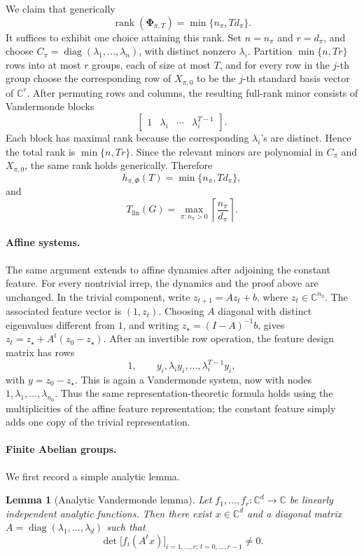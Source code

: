 \documentclass[11pt]{article}
\theoremstyle{plain}
\newtheorem{lemma}[theorem]{Lemma}
\theoremstyle{definition}
\theoremstyle{remark}
\begin{document}
We claim that generically
\[
\operatorname{rank}(\mathbf{\Phi}_{\pi,T})
=
\min\{n_\pi,Td_\pi\}.
\]
It suffices to exhibit one choice attaining this rank. Set
\(n=n_\pi\) and \(r=d_\pi\), and choose
\(C_\pi=\operatorname{diag}(\lambda_1,\ldots,\lambda_n)\), with distinct
nonzero \(\lambda_i\). Partition
\(\min\{n,Tr\}\) rows into at most \(r\) groups, each of size at most \(T\),
and for every row in the \(j\)-th group choose the corresponding row of
\(X_{\pi,0}\) to be the \(j\)-th standard basis vector of \(\mathbb C^r\).
After permuting rows and columns, the resulting full-rank minor consists of
Vandermonde blocks
\[
\begin{bmatrix}
1 & \lambda_i & \cdots & \lambda_i^{T-1}
\end{bmatrix}.
\]
Each block has maximal rank because the corresponding \(\lambda_i\)'s are
distinct. Hence the total rank is \(\min\{n,Tr\}\). Since the relevant minors
are polynomial in \(C_\pi\) and \(X_{\pi,0}\), the same rank holds
generically. Therefore
\[
h_{\pi,\Phi}(T)=\min\{n_\pi,Td_\pi\},
\]
and
\[
T_{\mathrm{lin}}(G)
=
\max_{\pi:n_\pi>0}
\left\lceil\frac{n_\pi}{d_\pi}\right\rceil .
\]

\paragraph{Affine systems.}
The same argument extends to affine dynamics after adjoining the constant
feature. For every nontrivial irrep, the dynamics and the proof above are
unchanged. In the trivial component, write
\(z_{t+1}=Az_t+b\), where \(z_t\in\mathbb C^{n_0}\). The associated feature
vector is \((1,z_t)\). Choosing \(A\) diagonal with distinct eigenvalues
different from \(1\), and writing \(z_\star=(I-A)^{-1}b\), gives
\(z_t=z_\star+A^t(z_0-z_\star)\). After an invertible row operation, the
feature design matrix has rows
\[
1,\qquad
y_i,\lambda_i y_i,\ldots,\lambda_i^{T-1}y_i,
\]
with \(y=z_0-z_\star\). This is again a Vandermonde system, now with nodes
\(1,\lambda_1,\ldots,\lambda_{n_0}\). Thus the same
representation-theoretic formula holds using the multiplicities of the affine
feature representation; the constant feature simply adds one copy of the
trivial representation.


\paragraph{Finite Abelian groups.}
We first record a simple analytic lemma.

\begin{lemma}[Analytic Vandermonde lemma]
\label{lem:analytic_vandermonde}
Let \(f_1,\ldots,f_r:\mathbb C^d\to\mathbb C\) be linearly independent
analytic functions. Then there exist \(x\in\mathbb C^d\) and a diagonal matrix
\(A=\operatorname{diag}(\lambda_1,\ldots,\lambda_d)\) such that
\[
\det\bigl[f_i(A^t x)\bigr]_
{i=1,\ldots,r;\,t=0,\ldots,r-1}\ne0.
\]
\end{lemma}
\end{document}
